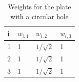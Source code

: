 \begin{table}
    \begin{center}
        \caption{Weights for the plate with a circular hole}\label{table:weights}
        \begin{tabular}{l@{\hskip 1cm}l@{\hskip 1cm}l@{\hskip 1cm}l}
            \hline
            i & $w_{i,1} $ & $w_{i,2}$        & $w_{i,3}$ \\
            \hline
            1 & 1          & ${1}/{\sqrt{2}}$ & 1         \\
            2 & 1          & ${1}/{\sqrt{2}}$ & 1         \\
            3 & 1          & ${1}/{\sqrt{2}}$ & 1         \\
            \hline
        \end{tabular}
    \end{center}
\end{table}

